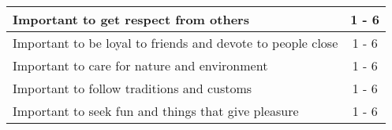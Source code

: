 \begin{table*}[p]
\begin{tabular}{|p{11.0cm}|c|}
        Important to get respect from others                                    & 1 - 6 \\ \hline
        Important to be loyal to friends and devote to people close             & 1 - 6 \\ \hline
        Important to care for nature and environment                            & 1 - 6 \\\hline
        Important to follow traditions and customs                              & 1 - 6 \\ \hline
        Important to seek fun and things that give pleasure                     & 1 - 6 \\ \hline
\end{tabular}
\end{table*}
